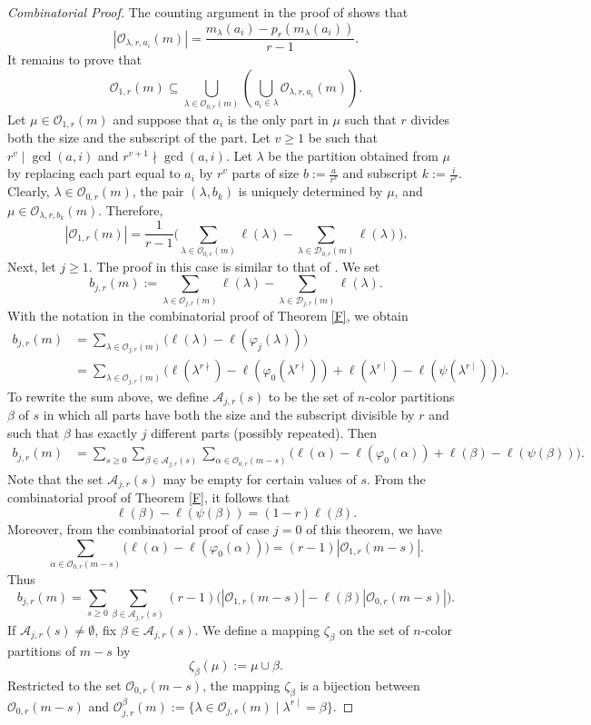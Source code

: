 \documentclass[reqno,12pt]{amsart}
\theoremstyle{definition}
\begin{document}
\begin{proof}[Combinatorial Proof]
The counting argument in the proof of \cite[Lemma 3.2]{Yang19} shows that $$|\mathcal O_{\lambda,r, a_i}(m)|=\frac{m_\lambda(a_i)-p_r(m_\lambda(a_i))}{r-1}.$$ It remains to prove that $$\mathcal O_{1,r}(m)\subseteq \bigcup_{\lambda\in \mathcal O_{0,r}(m)}\left(\bigcup_{a_i\in \lambda}\mathcal O_{\lambda,r, a_i}(m)\right).$$   Let $\mu \in \mathcal O_{1,r}(m)$ and suppose that $a_i$ is the only part in $\mu$ such that $r$ divides both the size and the subscript of the part. Let $v\geq 1$ be such that $r^v\mid \gcd(a,i)$ and $r^{v+1}\nmid \gcd(a,i)$. Let $\lambda$ be the partition obtained from $\mu$ by replacing each part equal to $a_i$ by $r^v$ parts of size $b:=\frac{a}{r^v}$ and subscript $k:=\frac{i}{r^v}$. Clearly, $\lambda \in \mathcal O_{0,r}(m)$, the pair $(\lambda,b_k)$ is uniquely determined by $\mu$, and   $\mu \in \mathcal O_{\lambda, r, b_k}(m)$. Therefore, 
$$|\mathcal O_{1,r}(m)|=\frac{1}{r-1}\Big(\sum_{\lambda\in\mathcal{O}_{0,r}(m)}\ell(\lambda)-\sum_{\lambda\in\mathcal{D}_{0,r}(m)}\ell(\lambda)\Big).$$
Next, let $j\geq 1$. The proof in this case is similar to that of \cite[Theorem 1.2]{BW23}. We set $$b_{j,r}(m):=\sum_{\lambda\in\mathcal{O}_{j,r}(m)}\ell(\lambda)-\sum_{\lambda\in\mathcal{D}_{j,r}(m)}\ell(\lambda).$$
With the notation in the combinatorial proof of Theorem \ref{F},  we obtain 
\begin{align*}b_{j,r}(m)& = \sum_{\lambda\in\mathcal{O}_{j,r}(m)} \Big( \ell(\lambda)-\ell(\varphi_j(\lambda))\Big)\\ 
& =  \sum_{\lambda\in\mathcal{O}_{j,r}(m)}\Big(\ell(\lambda^{r\nmid})-\ell(\varphi_0(\lambda^{r\nmid}))+ \ell(\lambda^{r\mid})-\ell(\psi(\lambda^{r\mid}))\Big).\end{align*} 
To rewrite the sum above, we define $\mathcal A_{j,r}(s)$ to be the set of $n$-color partitions $\beta$ of $s$ in which all parts have both the size and the subscript divisible by $r$ and such that $\beta$ has exactly $j$ different parts (possibly repeated). Then 
\begin{align*}b_{j,r}(m)& = \sum_{s\geq 0}\sum_{\beta\in \mathcal A_{j,r}(s)}\sum_{\alpha\in \mathcal O_{0,r}(m-s)}\Big(\ell(\alpha)-\ell(\varphi_0(\alpha))+\ell(\beta)-\ell(\psi(\beta)) \Big).\end{align*} 
Note that the set $\mathcal A_{j,r}(s)$ may be empty for certain values of $s$.
From the combinatorial proof of Theorem \ref{F}, it follows that
$$\ell(\beta)-\ell(\psi(\beta))=(1-r)\ell(\beta).$$ 
Moreover, from the combinatorial proof of case $j=0$ of this theorem, we have $$\sum_{\alpha\in \mathcal O_{0,r}(m-s)}\Big(\ell(\alpha)-\ell(\varphi_0(\alpha))\Big)=(r-1)|\mathcal O_{1,r}(m-s)|.$$ Thus $$b_{j,r}(m) = \sum_{s\geq 0}\sum_{\beta\in \mathcal A_{j,r}(s)}(r-1)\Big(|\mathcal O_{1,r}(m-s)|-\ell(\beta)|\mathcal O_{0,r}(m-s)|\Big). $$ If $\mathcal A_{j,r}(s)\neq \emptyset$, fix $\beta \in \mathcal A_{j,r}(s)$. We define a mapping $\zeta_\beta$ on the set of $n$-color partitions of $m-s$ by $$\zeta_\beta(\mu):=\mu \cup \beta.$$ 
Restricted to the set $\mathcal O_{0,r}(m-s)$, the mapping $\zeta_\beta$ is a bijection between $\mathcal O_{0,r}(m-s)$  and $\mathcal O^{\beta}_{j,r}(m):=\{\lambda \in \mathcal O_{j,r}(m)\mid \lambda^{r\mid}=\beta\}$.


\end{proof}
\end{document}
